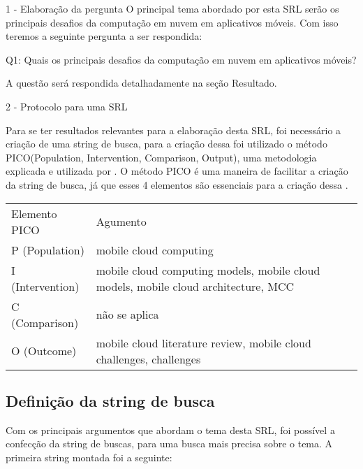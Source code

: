 \documentclass[12pt]{article}
\begin{document}
1 - Elaboração da pergunta
O principal tema abordado por esta SRL serão os principais desafios da computação em nuvem em aplicativos móveis. Com isso teremos a seguinte pergunta a ser respondida:

Q1: Quais os principais desafios da computação em nuvem em aplicativos móveis?

A questão será respondida detalhadamente na seção Resultado.

2 - Protocolo para uma SRL

Para se ter resultados relevantes para a elaboração desta SRL, foi necessário a criação de uma string de busca, para a criação dessa foi utilizado o método PICO(Population, Intervention, Comparison, Output), uma metodologia explicada e utilizada por \cite{SANTOS2007}. O método PICO é uma maneira de facilitar a criação da string de busca, já que esses 4 elementos são essenciais para a criação dessa \cite{SANTOS2007}.


\begin{table}[h]
 \centering
 {\renewcommand\arraystretch{1.25}
 \begin{tabular}{ l l }
  \cline{1-1}\cline{2-2}  
    \multicolumn{1}{|p{5cm}|}{Elemento PICO} &
    \multicolumn{1}{p{8cm}|}{Agumento}
  \\  
  \cline{1-1}\cline{2-2}  
    \multicolumn{1}{|p{5cm}|}{P (Population)} &
    \multicolumn{1}{p{8cm}|}{mobile cloud computing}
  \\  
  \cline{1-1}\cline{2-2}  
    \multicolumn{1}{|p{5cm}|}{I (Intervention)} &
    \multicolumn{1}{p{8cm}|}{mobile cloud computing models, mobile cloud models, mobile cloud architecture, MCC}
  \\  
  \cline{1-1}\cline{2-2}  
    \multicolumn{1}{|p{5cm}|}{C (Comparison)} &
    \multicolumn{1}{p{8cm}|}{não se aplica}
  \\  
  \cline{1-1}\cline{2-2}  
    \multicolumn{1}{|p{5cm}|}{O (Outcome)} &
    \multicolumn{1}{p{8cm}|}{mobile cloud literature review, mobile cloud challenges, challenges}
  \\  
  \hline
 \end{tabular} }
\end{table}
 
\subsection{Definição da string de busca}
Com os principais argumentos que abordam o tema desta SRL, foi possível a confecção da string de buscas, para uma busca mais precisa sobre o tema. A primeira string montada foi a seguinte:
 
\end{document}
